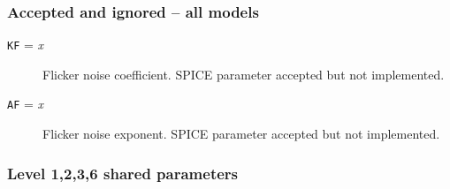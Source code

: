 \subsubsection{Accepted and ignored -- all models}
\begin{description}

\item[{\tt KF} = {\it x}]
Flicker noise coefficient.  SPICE parameter accepted but not
implemented.

\item[{\tt AF} = {\it x}]
Flicker noise exponent.  SPICE parameter accepted but not implemented.

\end{description}
\subsubsection{Level 1,2,3,6 shared parameters}
